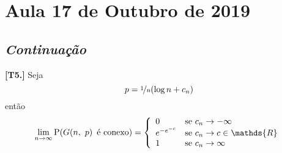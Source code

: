 { %

\delimitershortfall=-0.10pt

\newcommand{\given}{\,\middle|\,}               %

\newcommand{\Reals}{\mathds{R}}                 %

\newcommand{\defeq}{\vcentcolon=}               %
\newcommand{\eqdef}{=\vcentcolon}               %

\renewcommand{\l}{\mathopen{}\left}             %
\renewcommand{\r}{\vphantom{1j}\right}          %

\renewcommand{\P}{\mathrm{P}}                   %
\newcommand{\E}{\mathrm{E}}                     %
\newcommand{\e}{\mathrm{e}}                     %
\newcommand{\nf}{\nicefrac}                     %
\renewcommand{\d}{\cdot}                        %

\cleardoublepage
\section{Aula 17 de Outubro de 2019}
\label{2019_10_17}

\subsection*{\it Continuação}

\begin{teorema}
  \normalfont\textbf{[T5.]}
  Seja
  \vspace*{-\baselineskip}
  \[
    p = \nicefrac{1}{n}\l(\log n + c_n\r)
  \]
  então
  \vspace*{-\baselineskip}
  \[
    \lim_{n\rightarrow\infty} \P\l(G\l(n,\ p\r) \text{ é conexo}\r) = \l\{\begin{array}{ll}
      0                               & \text{se } c_n\rightarrow-\infty                            \\
      \mathrel{e}^{-\mathrel{e}^{-c}} & \text{se } c_n\rightarrow c\in\Reals                        \\
      1                               & \text{se } c_n\rightarrow\infty                             \\
    \end{array}\r.
  \]
\end{teorema}

}
